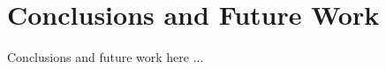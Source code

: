 \chapter{Conclusions and Future Work}\label{chap:conclusions}

\minitoc %

Conclusions and future work here ...